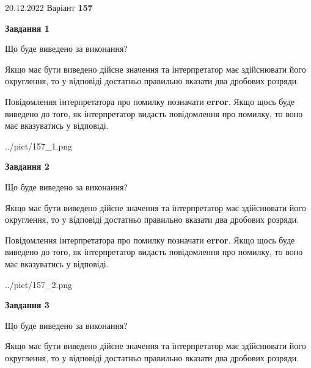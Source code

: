 \documentclass[12pt, ukrainian]{article}
\begin{document}
{20.12.2022 Варіант \No \textbf { 157 }\par}
{
\begin {Large}

{\begin {center}\textbf{Завдання 1}\end {center}}\par
Що буде виведено за виконання? \par

Якщо має бути виведено дійсне значення та інтерпретатор має здійснювати його округлення, 
то у відповіді достатньо правильно вказати два дробових розряди.

Повідомлення інтерпретатора про помилку позначати \textbf{error}.
Якщо щось буде виведено до того, як інтерпретатор видасть повідомлення про помилку, 
то воно має вказуватись у відповіді. \par

\begin{center}
	{../pict/157_1.png}
\end{center}
\newpage

{\begin {center}\textbf{Завдання 2}\end {center}}\par
Що буде виведено за виконання? \par

Якщо має бути виведено дійсне значення та інтерпретатор має здійснювати його округлення, 
то у відповіді достатньо правильно вказати два дробових розряди.

Повідомлення інтерпретатора про помилку позначати \textbf{error}.
Якщо щось буде виведено до того, як інтерпретатор видасть повідомлення про помилку, 
то воно має вказуватись у відповіді. \par

\begin{center}
	{../pict/157_2.png}
\end{center}
\newpage

{\begin {center}\textbf{Завдання 3}\end {center}}\par
Що буде виведено за виконання? \par

Якщо має бути виведено дійсне значення та інтерпретатор має здійснювати його округлення, 
то у відповіді достатньо правильно вказати два дробових розряди.


\end{Large}}
\end{document}
